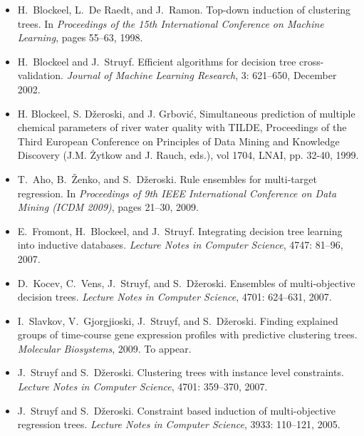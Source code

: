 \documentclass[a4paper]{report}
\begin{document}
\begin{itemize} 

\item H.~Blockeel, L.~De Raedt, and J.~Ramon.
\newblock Top-down induction of clustering trees.
\newblock In \emph{Proceedings of the 15th International Conference on Machine
  Learning}, pages 55--63, 1998.

\item H.~Blockeel and J.~Struyf.
\newblock Efficient algorithms for decision tree cross-validation.
\newblock \emph{Journal of Machine Learning Research}, 3: 621--650,
  December 2002.

\item H. Blockeel, S. D\v zeroski, and J. Grbovi\'c, Simultaneous prediction of multiple chemical parameters of river water quality with TILDE, Proceedings of the Third European Conference on Principles of Data Mining and Knowledge Discovery (J.M. \.{Z}ytkow and J. Rauch, eds.), vol 1704, LNAI, pp. 32-40, 1999.

\item T.~Aho, B.~{\v{Z}}enko, and S.~D{\v{z}}eroski.
\newblock Rule ensembles for multi-target regression.
\newblock In \emph{Proceedings of 9th IEEE International Conference on Data
  Mining (ICDM 2009)}, pages 21--30, 2009.

\item E.~Fromont, H.~Blockeel, and J.~Struyf.
\newblock Integrating decision tree learning into inductive databases.
\newblock \emph{Lecture Notes in Computer Science}, 4747: 81--96,
  2007.

\item D.~Kocev, C.~Vens, J.~Struyf, and S.~D{\v{z}}eroski.
\newblock Ensembles of multi-objective decision trees.
\newblock \emph{Lecture Notes in Computer Science}, 4701: 624--631,
  2007.

\item I.~Slavkov, V.~Gjorgjioski, J.~Struyf, and S.~D{\v z}eroski.
\newblock Finding explained groups of time-course gene expression profiles with
  predictive clustering trees.
\newblock \emph{Molecular Biosystems}, 2009.
\newblock To appear.

\item J.~Struyf and S.~D\v{z}eroski.
\newblock Clustering trees with instance level constraints.
\newblock \emph{Lecture Notes in Computer Science}, 4701: 359--370,
  2007.

\item J.~Struyf and S.~D{\v{z}}eroski.
\newblock Constraint based induction of multi-objective regression trees.
\newblock \emph{Lecture Notes in Computer Science}, 3933: 110--121,
  2005.


\end{itemize}
\end{document}
